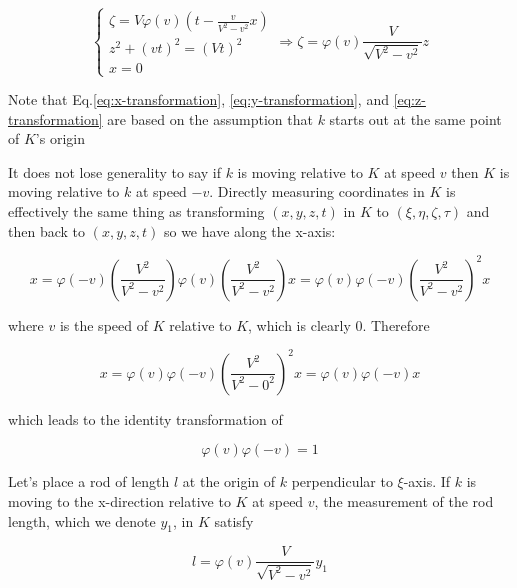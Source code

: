 \begin{equation}\label{eq:z-transformation}
    \left\{
    \begin{array}{l}
        \zeta = V\varphi(v)\left( t - \frac{v}{V^2 - v^2} x \right) \\
        z^2 + (vt)^2 = (Vt)^2 \\
        x = 0
    \end{array}
    \right.
    \Rightarrow
    \zeta = \varphi(v)\frac{V}{\sqrt{V^2 - v^2}}z
\end{equation}

Note that Eq.\ref{eq:x-transformation}, \ref{eq:y-transformation}, and \ref{eq:z-transformation} are based on the
assumption that $k$ starts out at the same point of $K$'s origin

It does not lose generality to say if $k$ is moving relative to $K$ at speed $v$ then $K$ is moving relative to $k$ at
speed $-v$. Directly measuring coordinates in $K$ is effectively the same thing as transforming $(x, y, z, t)$ in $K$
to $(\xi, \eta, \zeta, \tau)$ and then back to $(x, y, z, t)$ so we have along the x-axis:

\begin{equation}
    x = \varphi(-v)\left( \frac{V^2}{V^2 - v^2} \right) \varphi(v)\left( \frac{V^2}{V^2 - v^2} \right) x = \varphi(v)\varphi(-v)\left( \frac{V^2}{V^2 - v^2} \right)^2 x
\end{equation}

where $v$ is the speed of $K$ relative to $K$, which is clearly 0. Therefore

\begin{equation}
    x = \varphi(v)\varphi(-v)\left( \frac{V^2}{V^2 - 0^2} \right)^2 x = \varphi(v)\varphi(-v) x
\end{equation}

which leads to the identity transformation of

\begin{equation}\label{eq:trans-coef-prod-1}
    \varphi(v)\varphi(-v) = 1
\end{equation}

Let's place a rod of length $l$ at the origin of $k$ perpendicular to $\xi$-axis. If $k$ is moving to the x-direction
relative to $K$ at speed $v$, the measurement of the rod length, which we denote $y_1$, in $K$ satisfy

\begin{equation}
    l = \varphi(v)\frac{V}{\sqrt{V^2 - v^2}}y_1
\end{equation}

